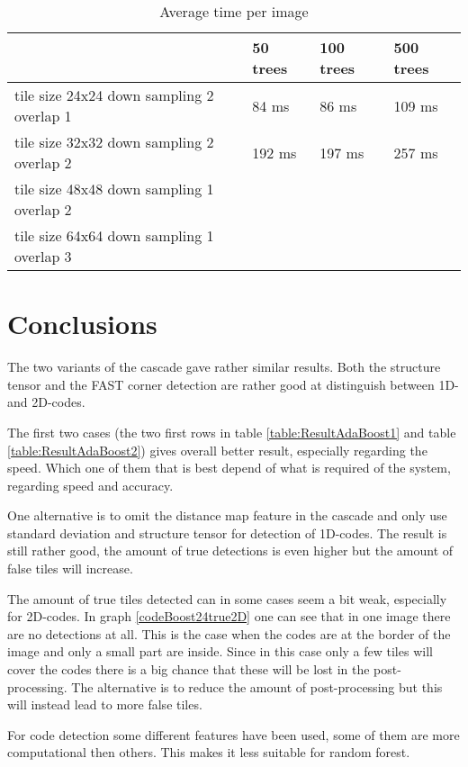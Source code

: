 \begin{table}[H]
\begin{center}
     \begin{tabular}{ | p{3cm} | p{2cm} | p{2cm} | p{2cm}|}
     \hline
      	& 50 trees & 100 trees & 500 trees \\ \hline
   	 tile size 24x24 \newline down sampling 2 \newline overlap 1 
   	 & 84 ms & 86 ms  & 109 ms 				\\ \hline
     tile size 32x32 \newline down sampling 2 \newline overlap 2 
     & 192 ms & 197 ms & 257 ms 				\\ \hline
     tile size 48x48 \newline down sampling 1 \newline overlap 2 
     &     &  &  \\ \hline
     tile size 64x64 \newline down sampling 1 \newline overlap 3 
     &  &  &	 \\ \hline
     \end{tabular}
\end{center}
\caption{Average time per image}
\label{tabel:timeRF}
\end{table}

\section{Conclusions}
\label{sec:Conclusions}
The two variants of the cascade gave rather similar results. Both the structure tensor and the FAST corner detection are rather good at distinguish between 1D- and 2D-codes.

The first two cases (the two first rows in table \ref{table:ResultAdaBoost1} and table \ref{table:ResultAdaBoost2}) gives overall better result, especially regarding the speed. Which one of them that is best depend of what is required of the system, regarding speed and accuracy.

One alternative is to omit the distance map feature in the cascade and only use standard deviation and structure tensor for detection of 1D-codes. The result is still rather good, the amount of true detections is even higher but the amount of false tiles will increase.

The amount of true tiles detected can in some cases seem a bit weak, especially for 2D-codes. In graph \ref{codeBoost24true2D} one can see that in one image there are no detections at all. This is the case when the codes are at the border of the image and only a small part are inside. Since in this case only a few tiles will cover the codes there is a big chance that these will be lost in the post-processing. The alternative is to reduce the amount of post-processing but this will instead lead to more false tiles.  

For code detection some different features have been used, some of them are more computational then others. This makes it less suitable for random forest.  
